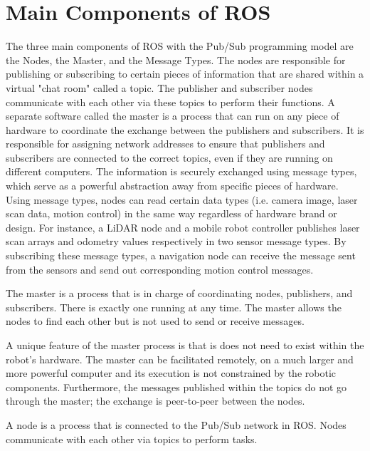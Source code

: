 \documentclass[twoside]{article}
\begin{document}
\section{Main Components of ROS} \label{main_component}\label{sec:maincomponent}
The three main components of ROS with the Pub/Sub programming model are the Nodes, the Master, and the Message Types. The nodes are responsible for publishing or subscribing to certain pieces of information that are shared within a virtual "chat room" called a topic. The publisher and subscriber nodes communicate with each other via these topics to perform their functions. A separate software called the master is a process that can run on any piece of hardware to coordinate the exchange between the publishers and subscribers. It is responsible for assigning network addresses to ensure that publishers and subscribers are connected to the correct topics, even if they are running on different computers. The information is securely exchanged using message types, which serve as a powerful abstraction away from specific pieces of hardware. Using message types, nodes can read certain data types (i.e. camera image, laser scan data, motion control) in the same way regardless of hardware brand or design. For instance, a LiDAR node and a mobile robot controller publishes laser scan arrays and odometry values respectively in two sensor message types. By subscribing these message types, a navigation node can receive the message sent from the sensors and send out corresponding motion control messages.

\begin{frm-def}[Master]
The master is a process that is in charge of coordinating nodes, publishers, and subscribers. There is exactly one running at any time. The master allows the nodes to find each other but is not used to send or receive messages.
\end{frm-def}

A unique feature of the master process is that is does not need to exist within the robot's hardware. The master can be facilitated remotely, on a much larger and more powerful computer and its execution is not constrained by the robotic components. Furthermore, the messages published within the topics do not go through the master; the exchange is peer-to-peer between the nodes.\\ %

\begin{frm-def}[Node]
A node is a process that is connected to the Pub/Sub network in ROS. Nodes communicate with each other via topics to perform tasks.
\end{frm-def}
\end{document}
